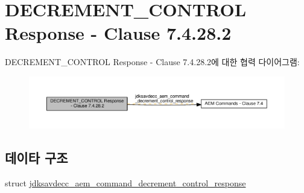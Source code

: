 \hypertarget{group__command__decrement__control__response}{}\section{D\+E\+C\+R\+E\+M\+E\+N\+T\+\_\+\+C\+O\+N\+T\+R\+OL Response -\/ Clause 7.4.28.2}
\label{group__command__decrement__control__response}
D\+E\+C\+R\+E\+M\+E\+N\+T\+\_\+\+C\+O\+N\+T\+R\+OL Response -\/ Clause 7.4.28.2에 대한 협력 다이어그램\+:
\nopagebreak
\begin{figure}[H]
\begin{center}
\leavevmode
\includegraphics[width=350pt]{group__command__decrement__control__response}
\end{center}
\end{figure}
\subsection*{데이타 구조}
\begin{DoxyCompactItemize}
\item 
struct \hyperlink{structjdksavdecc__aem__command__decrement__control__response}{jdksavdecc\+\_\+aem\+\_\+command\+\_\+decrement\+\_\+control\+\_\+response}
\end{DoxyCompactItemize}
